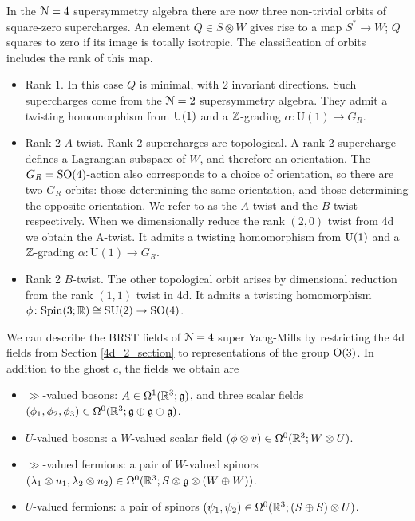 \documentclass[10pt, oneside]{article}
\renewcommand{\U}{\mathrm{U}}
\begin{document}
In the $\mathcal{N}=4$ supersymmetry algebra there are now three non-trivial orbits of square-zero supercharges.  An element $Q \in S \otimes W$ gives rise to a map $S^* \to W$; $Q$ squares to zero if its image is totally isotropic.  The classification of orbits includes the rank of this map.
\begin{itemize}
 \item Rank 1.  In this case $Q$ is minimal, with 2 invariant directions.  Such supercharges come from the $\mathcal{N}=2$ supersymmetry algebra.  They admit a twisting homomorphism from $\mathrm{U}(1)$ and a $\mathbb Z$-grading $\alpha \colon \U(1) \to G_R$.
 \item Rank 2 $A$-twist.  Rank 2 supercharges are topological.  A rank 2 supercharge defines a Lagrangian subspace of $W$, and therefore an orientation.  The $G_R = \mathrm{SO}(4)$-action also corresponds to a choice of orientation, so there are two $G_R$ orbits: those determining the same orientation, and those determining the opposite orientation.  We refer to as the $A$-twist and the $B$-twist respectively.  When we dimensionally reduce the rank $(2,0)$ twist from 4d we obtain the A-twist.  It admits a twisting homomorphism from $\mathrm{U}(1)$ and a $\mathbb Z$-grading $\alpha \colon \U(1) \to G_R$.
 \item Rank 2 $B$-twist.  The other topological orbit arises by dimensional reduction from the rank $(1,1)$ twist in 4d.  It admits a twisting homomorphism $\phi \colon \mathrm{Spin}(3;\mathbb R) \cong \mathrm{SU}(2) \to \mathrm{SO}(4)$. 
\end{itemize}

We can describe the BRST fields of $\mathcal{N}=4$ super Yang-Mills by restricting the 4d fields from Section \ref{4d_2_section} to representations of the group $\mathrm{O}(3)$.  In addition to the ghost $c$, the fields we obtain are
\begin{itemize}
 \item $\gg$-valued bosons: $A \in \Omega^1(\mathbb R^3; \mathfrak{g})$, and three scalar fields $(\phi_1,\phi_2,\phi_3) \in \Omega^0(\mathbb R^3; \mathfrak{g} \oplus \mathfrak{g} \oplus \mathfrak{g})$.
 \item $U$-valued bosons: a $W$-valued scalar field $(\phi \otimes v) \in \Omega^0(\mathbb R^3; W \otimes U)$.
 \item $\gg$-valued fermions: a pair of $W$-valued spinors $(\lambda_1 \otimes u_1, \lambda_2 \otimes u_2) \in \Omega^0(\mathbb R^3 ; S \otimes \mathfrak{g} \otimes (W \oplus W))$.
 \item $U$-valued fermions:  a pair of spinors $(\psi_1,\psi_2) \in \Omega^0(\mathbb R^3; (S\oplus S) \otimes U)$.
\end{itemize}
\end{document}
